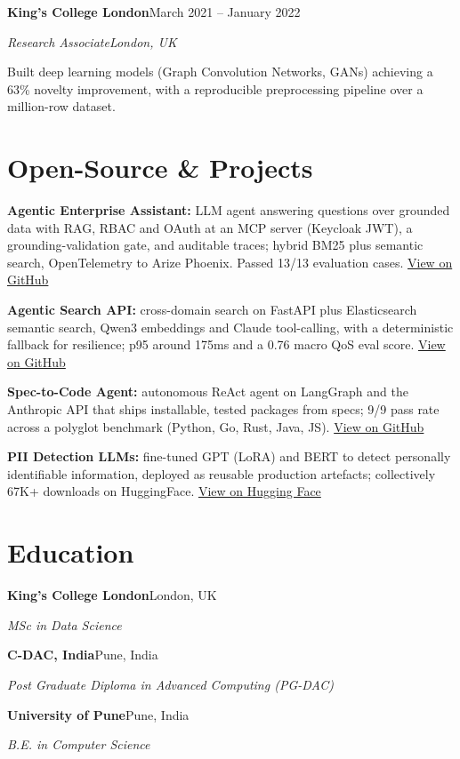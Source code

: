 \documentclass[10pt,a4paper]{article}
\newcommand{\entry}[4]{%
  {\color{company}\bfseries #1}\hfill {\color{muted}#2}\par
  \vspace{1pt}
  {\itshape #3}\hfill {\color{muted}\itshape #4}\par
  \vspace{3pt}%
}
\begin{document}
\entry{King's College London}{March 2021 -- January 2022}{Research Associate}{London, UK}
\begin{tight}
  \item Built deep learning models (Graph Convolution Networks, GANs) achieving a 63\% novelty improvement, with a reproducible preprocessing pipeline over a million-row dataset.
\end{tight}

\section{Open-Source \& Projects}
\begin{tight}
  \item \textbf{Agentic Enterprise Assistant:} LLM agent answering questions over grounded data with RAG, RBAC and OAuth at an MCP server (Keycloak JWT), a grounding-validation gate, and auditable traces; hybrid BM25 plus semantic search, OpenTelemetry to Arize Phoenix. Passed 13/13 evaluation cases. \href{https://github.com/abhijeetscode/Agentic-Enterprise-Assistant}{View on GitHub}
  \item \textbf{Agentic Search API:} cross-domain search on FastAPI plus Elasticsearch semantic search, Qwen3 embeddings and Claude tool-calling, with a deterministic fallback for resilience; p95 around 175ms and a 0.76 macro QoS eval score. \href{https://github.com/abhijeetscode/search-agent}{View on GitHub}
  \item \textbf{Spec-to-Code Agent:} autonomous ReAct agent on LangGraph and the Anthropic API that ships installable, tested packages from specs; 9/9 pass rate across a polyglot benchmark (Python, Go, Rust, Java, JS). \href{https://github.com/abhijeetscode/Spec-to-Code-Agent}{View on GitHub}
  \item \textbf{PII Detection LLMs:} fine-tuned GPT (LoRA) and BERT to detect personally identifiable information, deployed as reusable production artefacts; collectively 67K+ downloads on HuggingFace. \href{https://huggingface.co/ab-ai/pii_model}{View on Hugging Face}
\end{tight}

\section{Education}
{\color{company}\bfseries King's College London}\hfill {\color{muted}London, UK}\par
{\itshape MSc in Data Science}\par\vspace{2pt}
{\color{company}\bfseries C-DAC, India}\hfill {\color{muted}Pune, India}\par
{\itshape Post Graduate Diploma in Advanced Computing (PG-DAC)}\par\vspace{2pt}
{\color{company}\bfseries University of Pune}\hfill {\color{muted}Pune, India}\par
{\itshape B.E. in Computer Science}\par
\end{document}

